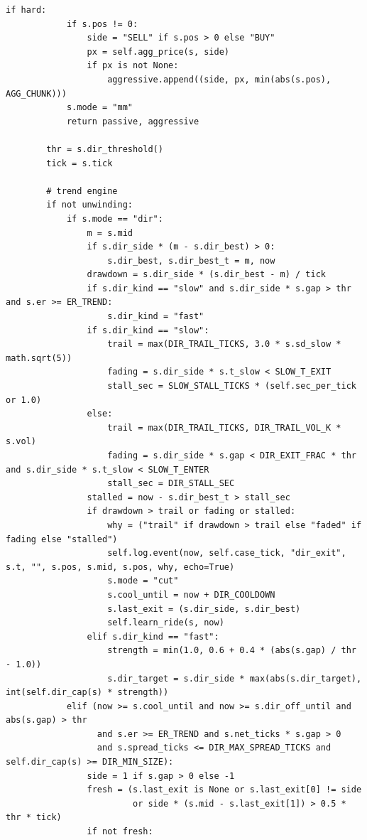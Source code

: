 \begin{lstlisting}[style=algocode]
        if hard:
            if s.pos != 0:
                side = "SELL" if s.pos > 0 else "BUY"
                px = self.agg_price(s, side)
                if px is not None:
                    aggressive.append((side, px, min(abs(s.pos), AGG_CHUNK)))
            s.mode = "mm"
            return passive, aggressive

        thr = s.dir_threshold()
        tick = s.tick

        # trend engine
        if not unwinding:
            if s.mode == "dir":
                m = s.mid
                if s.dir_side * (m - s.dir_best) > 0:
                    s.dir_best, s.dir_best_t = m, now
                drawdown = s.dir_side * (s.dir_best - m) / tick
                if s.dir_kind == "slow" and s.dir_side * s.gap > thr and s.er >= ER_TREND:
                    s.dir_kind = "fast"
                if s.dir_kind == "slow":
                    trail = max(DIR_TRAIL_TICKS, 3.0 * s.sd_slow * math.sqrt(5))
                    fading = s.dir_side * s.t_slow < SLOW_T_EXIT
                    stall_sec = SLOW_STALL_TICKS * (self.sec_per_tick or 1.0)
                else:
                    trail = max(DIR_TRAIL_TICKS, DIR_TRAIL_VOL_K * s.vol)
                    fading = s.dir_side * s.gap < DIR_EXIT_FRAC * thr and s.dir_side * s.t_slow < SLOW_T_ENTER
                    stall_sec = DIR_STALL_SEC
                stalled = now - s.dir_best_t > stall_sec
                if drawdown > trail or fading or stalled:
                    why = ("trail" if drawdown > trail else "faded" if fading else "stalled")
                    self.log.event(now, self.case_tick, "dir_exit", s.t, "", s.pos, s.mid, s.pos, why, echo=True)
                    s.mode = "cut"
                    s.cool_until = now + DIR_COOLDOWN
                    s.last_exit = (s.dir_side, s.dir_best)
                    self.learn_ride(s, now)
                elif s.dir_kind == "fast":
                    strength = min(1.0, 0.6 + 0.4 * (abs(s.gap) / thr - 1.0))
                    s.dir_target = s.dir_side * max(abs(s.dir_target), int(self.dir_cap(s) * strength))
            elif (now >= s.cool_until and now >= s.dir_off_until and abs(s.gap) > thr
                  and s.er >= ER_TREND and s.net_ticks * s.gap > 0
                  and s.spread_ticks <= DIR_MAX_SPREAD_TICKS and self.dir_cap(s) >= DIR_MIN_SIZE):
                side = 1 if s.gap > 0 else -1
                fresh = (s.last_exit is None or s.last_exit[0] != side
                         or side * (s.mid - s.last_exit[1]) > 0.5 * thr * tick)
                if not fresh:

\end{lstlisting}
